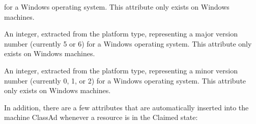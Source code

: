 \begin{description}
for a Windows operating system.
This attribute only exists on Windows machines.
%
\item[\AdAttr{WindowsMajorVersion}:] An integer, extracted from the
platform type, representing a major version number (currently 5 or 6)
for a Windows operating system.
This attribute only exists on Windows machines.
%
\item[\AdAttr{WindowsMinorVersion}:] An integer, extracted from the
platform type, representing a minor version number (currently 0, 1, or 2)
for a Windows operating system.
This attribute only exists on Windows machines.

\end{description}

In addition, there are a few attributes that are automatically
inserted into the machine ClassAd whenever a resource is in the
Claimed state:

